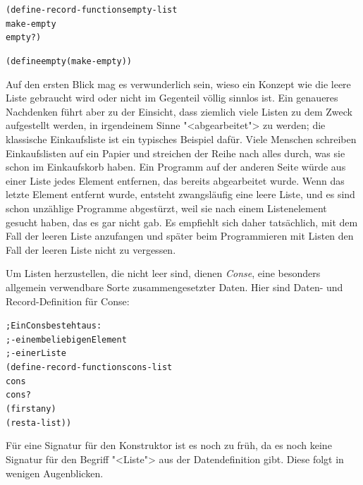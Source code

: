 %
\begin{alltt}
(define-record-functions empty-list
  make-empty
  empty?)

(define empty (make-empty))
\end{alltt}
%
Auf den ersten Blick mag es verwunderlich sein, wieso ein Konzept wie
die  leere Liste gebraucht wird oder nicht im Gegenteil völlig sinnlos
ist.  Ein genaueres Nachdenken führt aber zu der Einsicht, dass
ziemlich viele Listen zu dem Zweck aufgestellt werden, in irgendeinem
Sinne "<abgearbeitet"> zu werden; die klassische Einkaufsliste ist ein
typisches Beispiel dafür. Viele Menschen schreiben Einkaufslisten auf
ein Papier und streichen der Reihe nach alles durch, was sie schon im
Einkaufskorb haben.  Ein Programm auf der anderen Seite würde aus
einer Liste jedes Element entfernen, das bereits abgearbeitet wurde.
Wenn das letzte Element entfernt wurde, entsteht zwangsläufig eine
leere Liste, und es sind schon unzählige Programme abgestürzt, weil
sie nach einem Listenelement gesucht haben, das es gar nicht gab.  Es
empfiehlt sich daher tatsächlich, mit dem Fall der leeren Liste
anzufangen und später beim Programmieren mit Listen den Fall der
leeren Liste nicht zu vergessen.

Um Listen herzustellen, die nicht leer
sind, dienen \textit{Conse}, eine besonders allgemein
verwendbare Sorte zusammengesetzter Daten.  Hier sind Daten- und
Record-Definition für Conse:\label{def:cons}
%
\begin{alltt}
; Ein Cons besteht aus:
; - einem beliebigen Element
; - einer Liste
(define-record-functions cons-list
  cons
  cons?
  (first any)
  (rest  a-list))
\end{alltt}
%
Für eine Signatur für den Konstruktor ist es noch zu früh, da es noch
keine Signatur für den Begriff "<Liste"> aus der Datendefinition
gibt.  Diese folgt in wenigen Augenblicken.

